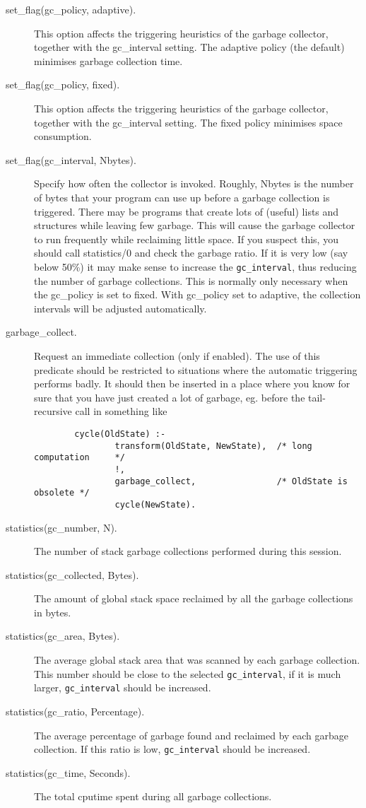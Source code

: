 \begin{description}
\item [set\_flag(gc\_policy, adaptive).]
	This option affects the triggering heuristics of the garbage
	collector, together with the gc_interval setting.
	The adaptive policy (the default) minimises garbage collection time.
\item [set\_flag(gc\_policy, fixed).]
	This option affects the triggering heuristics of the garbage
	collector, together with the gc_interval setting.
	The fixed policy minimises space consumption. 
\item [set\_flag(gc\_interval, Nbytes).]
	Specify how often the collector is invoked. Roughly, Nbytes
	is the number of bytes that your program can use up before
	a garbage collection is triggered.
	There may be programs that create lots of (useful) lists and
	structures while leaving few garbage. This will cause the garbage
	collector to run frequently while reclaiming little space.
	If you suspect this, you should call statistics/0 and check
	the garbage ratio. If it is very low (say below 50\%) it may
	make sense to increase the {\tt gc_interval}, thus reducing
	the number of garbage collections.  This is normally only
	necessary when the gc_policy is set to fixed.  With gc_policy
	set to adaptive, the collection intervals will be adjusted
	automatically.
\item [garbage\_collect.]
	Request an immediate collection (only if enabled). The use of this
	predicate should be restricted to situations where the automatic
	triggering performs badly. It should then be inserted in a place
	where you know for sure that you have just created a lot of garbage,
	eg. before the tail-recursive call in something like
\begin{verbatim}
        cycle(OldState) :-
                transform(OldState, NewState),  /* long computation     */
                !,
                garbage_collect,                /* OldState is obsolete */
                cycle(NewState).
\end{verbatim}
\item [statistics(gc\_number, N).]
	The number of stack garbage collections performed during this {\eclipse} session.
\item [statistics(gc\_collected, Bytes).]
	The amount of global stack space reclaimed by all the
	garbage collections in bytes.
\item [statistics(gc\_area, Bytes).]
	The average global stack area that was scanned by each garbage
	collection. This number should be close to the selected
	{\tt gc_interval}, if it is much larger, {\tt gc_interval}
	should be increased.
\item [statistics(gc\_ratio, Percentage).]
	The average percentage of garbage found and reclaimed by each
	garbage collection.
	If this ratio is low, {\tt gc_interval} should be increased.
\item [statistics(gc\_time, Seconds).]
	The total cputime spent during all garbage collections.
\end{description}

